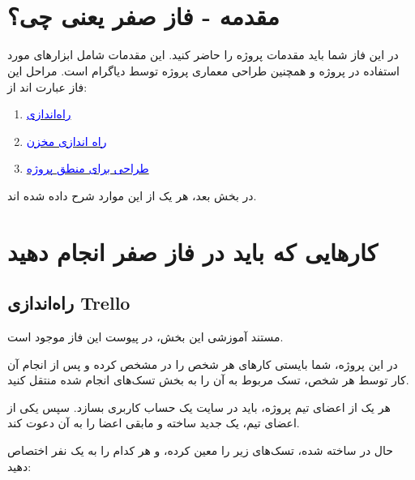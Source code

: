 \documentclass[]{article}
\begin{document}
\KashidaOff


 \Large \textbf{\\\\
}






\section* {{\titr مقدمه - فاز صفر یعنی چی؟}}

در این فاز شما باید مقدمات پروژه را حاضر کنید. این مقدمات شامل ابزارهای مورد استفاده در پروژه و همچنین طراحی معماری پروژه توسط دیاگرام  است. مراحل این فاز عبارت اند از:

\begin{enumerate}
\item
\hyperref[subsec:trello]{\textcolor{blue}{راه‌اندازی }}

\item
\hyperref[subsec:github]{\textcolor{blue}{راه اندازی مخزن }}

\item
\hyperref[subsec:uml]{\textcolor{blue}{طراحی  برای منطق پروژه}}


\end{enumerate}

در بخش بعد، هر یک از این موارد شرح داده شده اند.

\newpage
\section*{{\titr کارهایی که باید در فاز صفر انجام دهید}}


\subsection*{{\titr راه‌اندازی Trello}}

\label{subsec:trello}

مستند آموزشی این بخش، در پیوست این فاز موجود است.

در این پروژه، شما بایستی کارهای هر شخص را در   مشخص کرده و پس از انجام آن کار توسط هر شخص، تسک مربوط به آن را  به بخش تسک‌های انجام شده منتقل کنید.

هر یک از اعضای تیم پروژه، باید در سایت
\href{https://trello.com/}{\textcolor{blue}{}}
  یک حساب کاربری بسازد. سپس یکی از اعضای تیم، یک  جدید ساخته و مابقی اعضا را به آن دعوت کند.

حال در  ساخته شده، تسک‌های زیر را معین کرده، و هر کدام را به یک نفر اختصاص دهید:
\end{document}
